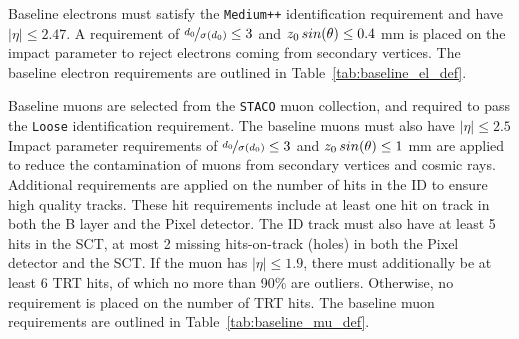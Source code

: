 Baseline electrons must satisfy the \texttt{Medium++} identification
requirement and have $|\eta| \leq 2.47$.
A requirement of $\nicefrac{d_0}{\sigma(d_0)} \leq 3$ and $z_0\,sin(\theta) \leq 0.4$ mm
is placed on the impact parameter to reject electrons coming from secondary
vertices.
The baseline electron requirements are outlined in
Table~\ref{tab:baseline_el_def}.

\begin{table}[ht]
\caption{Baseline electron requirements.}
\label{tab:baseline_el_def}
\end{table}

Baseline muons are selected from the \texttt{STACO} muon collection, and
required to pass the \texttt{Loose} identification requirement. The baseline
muons must also have $|\eta| \leq 2.5$ 
Impact parameter requirements of $\nicefrac{d_0}{\sigma(d_0)} \leq 3$ and
$z_0\,sin(\theta) \leq 1$ mm are applied to reduce the contamination of muons
from secondary vertices and cosmic rays.
Additional requirements are applied on the number of hits in the ID to ensure
high quality tracks.
These  hit requirements include at least one hit on track in both the B layer
and the Pixel detector.
The ID track must also have at least 5 hits in the SCT, at most 2 missing 
hits-on-track (holes) in both the Pixel detector and the SCT. 
If the muon has $|\eta| \leq 1.9$, there must additionally be at least 6 TRT
hits, of which no more than 90\% are outliers.
Otherwise, no requirement is placed on the number of TRT hits.
The baseline muon requirements are outlined in Table~\ref{tab:baseline_mu_def}.

